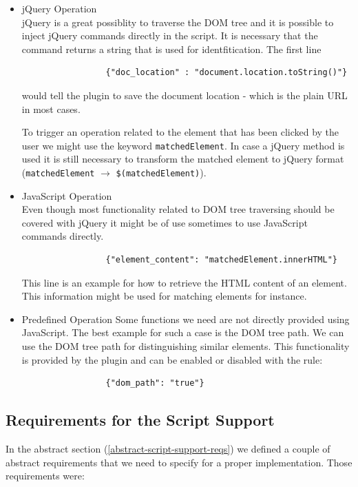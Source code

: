 \begin{itemize}
	\item jQuery Operation \\ 
	jQuery is a great possiblity to traverse the DOM tree and it is possible to inject jQuery commands directly in the script. It is necessary that the command returns a string that is used for identfitication. The first line
		\begin{lstlisting}
		         {"doc_location" : "document.location.toString()"}
		\end{lstlisting}
	would tell the plugin to save the document location - which is the plain URL in most cases. 
	
	To trigger an operation related to the element that has been clicked by the user we might use the keyword \verb^matchedElement^. In case a jQuery method is used it is still necessary to transform the matched element to jQuery format (\verb^matchedElement^ $\rightarrow$ \verb^$(matchedElement)^). 
	
	\item	 JavaScript Operation \\
	Even though most functionality related to DOM tree traversing should be covered with jQuery it might be of use sometimes to use JavaScript commands directly. 
		\begin{lstlisting}
		         {"element_content": "matchedElement.innerHTML"}
		\end{lstlisting}
	This line is an example for how to retrieve the HTML content of an element. This information might be used for matching elements for instance. 
	
	\item Predefined Operation \label{predefined-operation}
	Some functions we need are not directly provided using JavaScript. The best example for such a case is the DOM tree path. We can use the DOM tree path for distinguishing similar elements. This functionality is provided by the plugin and can be enabled or disabled with the rule:
		\begin{lstlisting}
		         {"dom_path": "true"}
		\end{lstlisting}	
\end{itemize}

\subsection{Requirements for the Script Support}

In the abstract section (\ref{abstract-script-support-reqs}) we defined a couple of abstract requirements that we need to specify for a proper implementation. Those requirements were:

